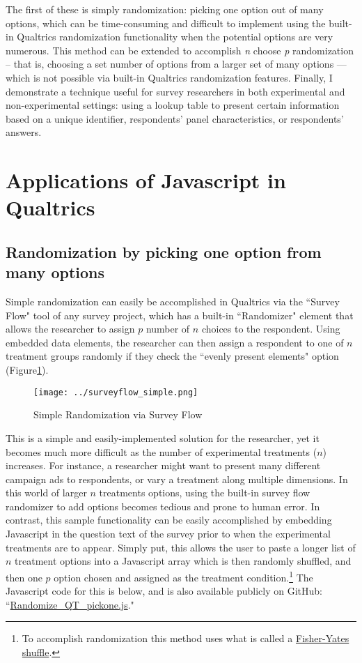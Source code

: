 \documentclass[12pt]{article}
\begin{document}
The first of these is simply randomization: picking one option out of many options, which can be time-consuming and difficult to implement using the built-in Qualtrics randomization functionality when the potential options are very numerous. This method can be extended to accomplish \emph{n} choose \emph{p} randomization -- that is, choosing a set number of options from a larger set of many options --- which is not possible via built-in Qualtrics randomization features. Finally, I demonstrate a technique useful for survey researchers in both experimental and non-experimental settings: using a lookup table to present certain information based on a unique identifier, respondents' panel characteristics, or respondents' answers.

\section{Applications of Javascript in Qualtrics}

\subsection{Randomization by picking one option from many options}
Simple randomization can easily be accomplished in Qualtrics via the ``Survey Flow" tool of any survey project, which has a built-in ``Randomizer" element that allows the researcher to assign $p$ number of $n$ choices to the respondent. Using embedded data elements, the researcher can then assign a respondent to one of $n$ treatment groups randomly if they check the ``evenly present elements" option (Figure\ref{fig:surveyflow_simple}).

\begin{figure}[!h] \centering 
 \caption{Simple Randomization via Survey Flow} 
\texttt{[image: ../surveyflow\_simple.png]}
  \label{fig:surveyflow_simple} 
  \end{figure} 

This is a simple and easily-implemented solution for the researcher, yet it becomes much more difficult as the number of experimental treatments ($n$) increases. For instance, a researcher might want to present many different campaign ads to respondents, or vary a treatment along multiple dimensions. In this world of larger $n$ treatments options, using the built-in survey flow randomizer to add options becomes tedious and prone to human error. In contrast, this sample functionality can be easily accomplished by embedding Javascript in the question text of the survey prior to when the experimental treatments are to appear. Simply put, this allows the user to paste a longer list of $n$ treatment options into a Javascript array which is then randomly shuffled, and then one $p$ option chosen and assigned as the treatment condition.\footnote{To accomplish randomization this method uses what is called a \href{https://en.wikipedia.org/wiki/Fisher\%E2\%80\%93Yates\_shuffle}{Fisher-Yates shuffle}.} The Javascript code for this is below, and is also available publicly on GitHub: ``\href{https://github.com/justindbk/qualtrics-javascript}{Randomize\_QT\_pickone.js}."
\end{document}
